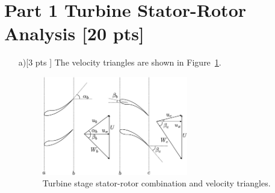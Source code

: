 \documentclass[12pt]{article}
\begin{document}
\begin{titlepage}
\vfill %

\end{titlepage}


\section{Part 1 Turbine Stator-Rotor Analysis [20 pts]}
\begin{itemize}
	\item[a)[3 pts]]
	The velocity triangles are shown in Figure~\ref{fig:stator_rotor}.
	\begin{figure}[H]
		\centering
		\includegraphics[width=0.6\textwidth]{stator_rotor}
		\caption{Turbine stage stator-rotor combination and velocity triangles.}
		\label{fig:stator_rotor}
	\end{figure}
	

\end{itemize}
\end{document}
